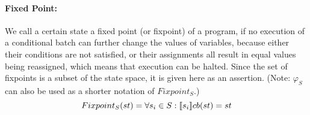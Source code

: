 \paragraph{Fixed Point:}
We call a certain state a fixed point (or fixpoint) of a program, if no execution of a conditional batch can further change the values of variables, because either their conditions are not satisfied, or their assignments all result in equal values being reassigned, which means that execution can be halted. Since the set of fixpoints is a subset of the state space, it is given here as an assertion. (Note: $\varphi_S$ can also be used as a shorter notation of $Fixpoint_S$.)
\begin{equation}
    Fixpoint_S(st) = \forall s_i \in S : \llbracket s_i \rrbracket cb(st) = st
\end{equation}
\begin{code}
    \>[2]\AgdaSpace{}%
    \AgdaSymbol{:}\AgdaSpace{}%
    \AgdaSpace{}%
    \AgdaSpace{}%
    \<%
    \\
    \>[2]\AgdaSpace{}%
    \AgdaSpace{}%
    \AgdaSymbol{=}\AgdaSpace{}%
    \AgdaSpace{}%
    \AgdaSpace{}%
    \AgdaSpace{}%
    \AgdaSpace{}%
    \AgdaSpace{}%
    \AgdaSpace{}%
    \AgdaSpace{}%
    \AgdaSpace{}%
    \AgdaSpace{}%
    \AgdaSpace{}%
    \AgdaSpace{}%
    \AgdaSpace{}%
    \AgdaSymbol{)}\AgdaSpace{}%
    \<%
    \\
    \\[\AgdaEmptyExtraSkip]%
    \>[2]\AgdaSpace{}%
    \AgdaSpace{}%
    \<%
    \\
    \>[2]\AgdaSpace{}%
    \AgdaSymbol{:}\AgdaSpace{}%
    \AgdaSpace{}%
    \AgdaSpace{}%
    \<%
    \\
    \>[2]\AgdaOperator{\AgdaFunction{φ[}}\AgdaSpace{}%
    \AgdaSpace{}%
    \AgdaOperator{\AgdaFunction{]}}\AgdaSpace{}%
    \AgdaSymbol{=}\AgdaSpace{}%
    \AgdaSpace{}%
    \<%
\end{code}

